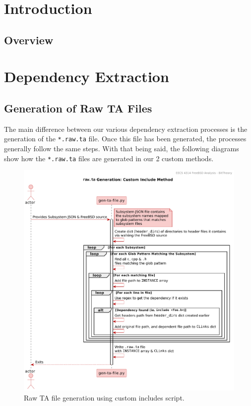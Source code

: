 \documentclass[12pt, dvipsnames, a4paper]{article}
\begin{document}
\section{Introduction}
\lipsum[1]

\subsection{Overview}
\lipsum[1]

\section{Dependency Extraction}

\clearpage
\subsection{Generation of Raw TA Files}
The main difference between our various dependency extraction processes
is the generation of the \texttt{*.raw.ta} file. Once this file has been generated,
the processes generally follow the same steps. With that being said,
the following diagrams show how the \texttt{*.raw.ta} files are generated
in our 2 custom methods.
\begin{figure}[!htb]
	\center
	\includegraphics[width = 350pt]{assets/sequence_diagrams/custom_includes.pdf}
	\caption{Raw TA file generation using custom includes script.}
\end{figure}
\end{document}
